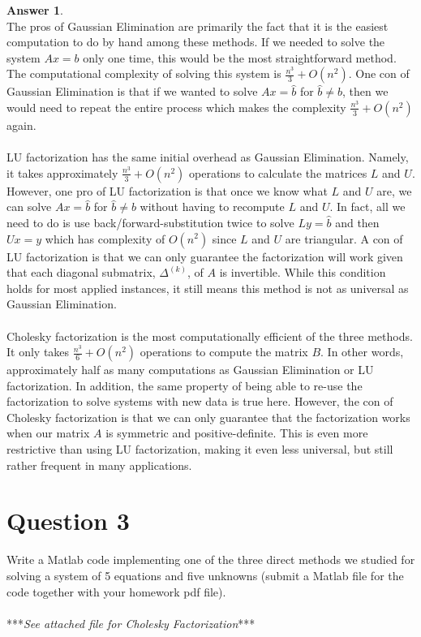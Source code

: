 \documentclass[10pt,a4paper]{article}
\theoremstyle{definition}
\newtheorem*{answer*}{Answer}
\theoremstyle{definition}
\numberwithin{equation}{section}
\begin{document}
\begin{answer*}$ $
\\The pros of Gaussian Elimination are primarily the fact that it is the easiest computation to do by hand among these methods. If we needed to solve the system $Ax = b$ only one time, this would be the most straightforward method. The computational complexity of solving this system is $\frac{n^3}{3} + O(n^2)$. One con of Gaussian Elimination is that if we wanted to solve $Ax = \hat{b}$ for $\hat{b} \neq b$, then we would need to repeat the entire process which makes the complexity $\frac{n^3}{3} + O(n^2)$ again. 
\\
\\LU factorization has the same initial overhead as Gaussian Elimination. Namely, it takes approximately $\frac{n^3}{3} + O(n^2)$ operations to calculate the matrices $L$ and $U$. However, one pro of LU factorization is that once we know what $L$ and $U$ are, we can solve $Ax = \hat{b}$ for $\hat{b} \neq b$ without having to recompute $L$ and $U$. In fact, all we need to do is use back/forward-substitution twice to solve $Ly = \hat{b}$ and then $Ux = y$ which has complexity of $O(n^2)$ since $L$ and $U$ are triangular. A con of LU factorization is that we can only guarantee the factorization will work given that each diagonal submatrix, $\Delta^{(k)}$, of $A$ is invertible. While this condition holds for most applied instances, it still means this method is not as universal as Gaussian Elimination. 
\\
\\Cholesky factorization is the most computationally efficient of the three methods. It only takes $\frac{n^3}{6} + O(n^2)$ operations to compute the matrix $B$. In other words, approximately half as many computations as Gaussian Elimination or LU factorization. In addition, the same property of being able to re-use the factorization to solve systems with new data is true here. However, the con of Cholesky factorization is that we can only guarantee that the factorization works when our matrix $A$ is symmetric and positive-definite. This is even more restrictive than using LU factorization, making it even less universal, but still rather frequent in many applications.
\end{answer*}

\section*{Question 3}
Write a Matlab code implementing one of the three direct methods we studied for
solving a system of 5 equations and five unknowns (submit a Matlab file for the code
together with your homework pdf file).
\\
\\***\textit{See attached file for Cholesky Factorization}***
\end{document}
